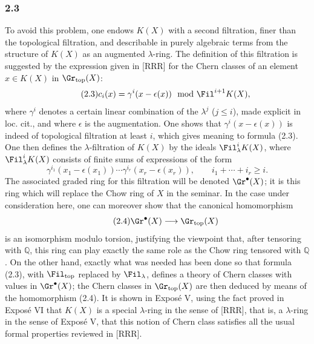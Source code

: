 \subsubsection*{2.3}
To avoid this problem, one endows $K(X)$ with a second filtration, finer than the topological filtration, and describable in purely algebraic terms from the structure of $K(X)$ as an augmented $\lambda$-ring. The definition of this filtration is suggested by the expression given in [RRR] for the Chern classes of an element $x\in K(X)$ in $\Gr_{\mathrm{top}}(X)$:
\begin{equation}\tag{2.3}
c_i(x)=\gamma^i(x-\epsilon(x))\mod \Fil^{i+1}K(X),
\end{equation}
where $\gamma^i$ denotes a certain linear combination of the $\lambda^j$ ($j\le i$), made explicit in loc. cit., and where $\epsilon$ is the augmentation. One shows that $\gamma^i(x-\epsilon(x))$ is indeed of topological filtration at least $i$, which gives meaning to formula (2.3). One then defines the $\lambda$-filtration of $K(X)$ by the ideals $\Fil^i_\lambda K(X)$, where $\Fil^i_\lambda K(X)$ consists of finite sums of expressions of the form
\[
\gamma^{i_1}(x_1-\epsilon(x_1))\cdots \gamma^{i_r}(x_r-\epsilon(x_r)),\qquad i_1+\cdots+i_r\ge i.
\]
The associated graded ring for this filtration will be denoted $\Gr^\bullet(X)$; it is this ring which will replace the Chow ring of $X$ in the seminar. In the case under consideration here, one can moreover show that the canonical homomorphism
\begin{equation}\tag{2.4}
\Gr^\bullet(X)\longrightarrow \Gr_{\mathrm{top}}(X)
\end{equation}
is an isomorphism modulo torsion, justifying the viewpoint that, after tensoring with $\mathbb Q$, this ring can play exactly the same role as the Chow ring tensored with $\mathbb Q$. On the other hand, exactly what was needed has been done so that formula (2.3), with $\Fil_{\mathrm{top}}$ replaced by $\Fil_\lambda$, defines a theory of Chern classes with values in $\Gr^\bullet(X)$; the Chern classes in $\Gr_{\mathrm{top}}(X)$ are then deduced by means of the homomorphism (2.4). It is shown in Exposé V, using the fact proved in Exposé VI that $K(X)$ is a special $\lambda$-ring in the sense of [RRR], that is, a $\lambda$-ring in the sense of Exposé V, that this notion of Chern class satisfies all the usual formal properties reviewed in [RRR].

